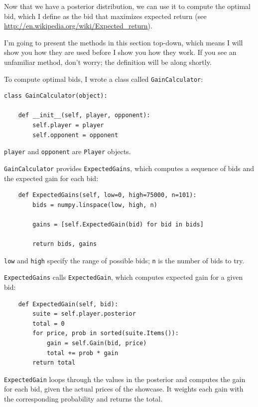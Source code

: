 \documentclass[12pt]{book}
\begin{document}
Now that we have a posterior distribution, we can use it to
compute the optimal bid, which I define as the bid that maximizes
expected return (see \url{http://en.wikipedia.org/wiki/Expected_return}).

I'm going to present the methods in this section top-down, which
means I will show you how they are used before I show you how they
work.  If you see an unfamiliar method, don't worry; the definition
will be along shortly.

To compute optimal bids, I wrote a class called {\tt GainCalculator}:

\begin{verbatim}
class GainCalculator(object):

    def __init__(self, player, opponent):
        self.player = player
        self.opponent = opponent
\end{verbatim}

{\tt player} and {\tt opponent} are {\tt Player} objects.

{\tt GainCalculator} provides {\tt ExpectedGains}, which
computes a sequence of bids and the expected gain for each
bid:

\begin{verbatim}
    def ExpectedGains(self, low=0, high=75000, n=101):
        bids = numpy.linspace(low, high, n)

        gains = [self.ExpectedGain(bid) for bid in bids]

        return bids, gains
\end{verbatim}

{\tt low} and {\tt high} specify the range of possible bids;
{\tt n} is the number of bids to try.  

{\tt ExpectedGains} calls {\tt ExpectedGain}, which
computes expected gain for a given bid:

\begin{verbatim}
    def ExpectedGain(self, bid):
        suite = self.player.posterior
        total = 0
        for price, prob in sorted(suite.Items()):
            gain = self.Gain(bid, price)
            total += prob * gain
        return total
\end{verbatim}

{\tt ExpectedGain} loops through the values in the posterior
and computes the gain for each bid, given the actual prices of
the showcase.  It weights each gain with the corresponding
probability and returns the total.
\end{document}
